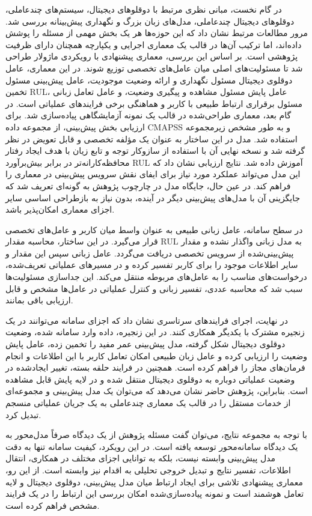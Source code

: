 \documentclass[a4paper,fleqn]{report}
\begin{document}
در گام نخست، مبانی نظری مرتبط با دوقلوهای دیجیتال، سیستم‌های چندعاملی، دوقلوهای دیجیتال چندعاملی، مدل‌های زبان بزرگ و نگهداری پیش‌بینانه بررسی شد. مرور مطالعات مرتبط نشان داد که این حوزه‌ها هر یک بخش مهمی از مسئله را پوشش داده‌اند، اما ترکیب آن‌ها در قالب یک معماری اجرایی و یکپارچه همچنان دارای ظرفیت پژوهشی است. بر اساس این بررسی، معماری پیشنهادی با رویکردی ماژولار طراحی شد تا مسئولیت‌های اصلی میان عامل‌های تخصصی توزیع شوند. در این معماری، عامل دوقلوی دیجیتال مسئول نگهداری و ارائه وضعیت موجودیت، عامل پیش‌بینی مسئول تخمین \gls{RUL}، عامل پایش مسئول مشاهده و پیگیری وضعیت، و عامل تعامل زبانی مسئول برقراری ارتباط طبیعی با کاربر و هماهنگی برخی فرایندهای عملیاتی است.
در گام بعد، معماری طراحی‌شده در قالب یک نمونه آزمایشگاهی پیاده‌سازی شد. برای ارزیابی بخش پیش‌بینی، از مجموعه داده \gls{CMAPSS} و به طور مشخص زیرمجموعه  استفاده شد. مدل  در این ساختار به عنوان یک مؤلفه تخصصی و قابل تعویض در نظر گرفته شد و نسخه نهایی آن با استفاده از سازوکار توجه و تابع زیان  با هدف ایجاد رفتار محافظه‌کارانه‌تر در برابر بیش‌برآورد \gls{RUL} آموزش داده شد. نتایج ارزیابی نشان داد که این مدل می‌تواند عملکرد مورد نیاز برای ایفای نقش سرویس پیش‌بینی در معماری را فراهم کند. در عین حال، جایگاه مدل در چارچوب پژوهش به گونه‌ای تعریف شد که جایگزینی آن با مدل‌های پیش‌بینی دیگر در آینده، بدون نیاز به بازطراحی اساسی سایر اجزای معماری امکان‌پذیر باشد.

در سطح سامانه، عامل زبانی طبیعی به عنوان واسط میان کاربر و عامل‌های تخصصی قرار می‌گیرد. در این ساختار، محاسبه مقدار \gls{RUL} به مدل زبانی واگذار نشده و مقدار پیش‌بینی‌شده از سرویس تخصصی دریافت می‌گردد. عامل زبانی سپس این مقدار و سایر اطلاعات موجود را برای کاربر تفسیر کرده و در مسیرهای عملیاتی تعریف‌شده، درخواست‌های مناسب را به عامل‌های مربوطه منتقل می‌کند. این جداسازی مسئولیت‌ها سبب شد که محاسبه عددی، تفسیر زبانی و کنترل عملیاتی در عامل‌ها مشخص و قابل ارزیابی باقی بمانند.

در نهایت، اجرای فرایندهای سرتاسری نشان داد که اجزای سامانه می‌توانند در یک زنجیره مشترک با یکدیگر همکاری کنند. در این زنجیره، داده وارد سامانه شده، وضعیت دوقلوی دیجیتال شکل گرفته، مدل پیش‌بینی عمر مفید را تخمین زده، عامل پایش وضعیت را ارزیابی کرده و عامل زبان طبیعی امکان تعامل کاربر با این اطلاعات و انجام فرمان‌های مجاز را فراهم کرده است. همچنین در فرایند حلقه بسته، تغییر ایجادشده در وضعیت عملیاتی دوباره به دوقلوی دیجیتال منتقل شده و در لایه پایش قابل مشاهده است. بنابراین، پژوهش حاضر نشان می‌دهد که می‌توان یک مدل پیش‌بینی و مجموعه‌ای از خدمات مستقل را در قالب یک معماری چندعاملی به یک جریان عملیاتی منسجم تبدیل کرد.

با توجه به مجموعه نتایج، می‌توان گفت مسئله پژوهش از یک دیدگاه صرفاً مدل‌محور به یک دیدگاه سامانه‌محور توسعه یافته است. در این رویکرد، کیفیت سامانه تنها به دقت مدل پیش‌بینی وابسته نیست، بلکه به توانایی اجزای مختلف در همکاری، انتقال اطلاعات، تفسیر نتایج و تبدیل خروجی تحلیلی به اقدام نیز وابسته است. از این رو، معماری پیشنهادی تلاشی برای ایجاد ارتباط میان مدل پیش‌بینی، دوقلوی دیجیتال و لایه تعامل هوشمند است و نمونه پیاده‌سازی‌شده امکان بررسی این ارتباط را در یک فرایند مشخص فراهم کرده است.
\end{document}
